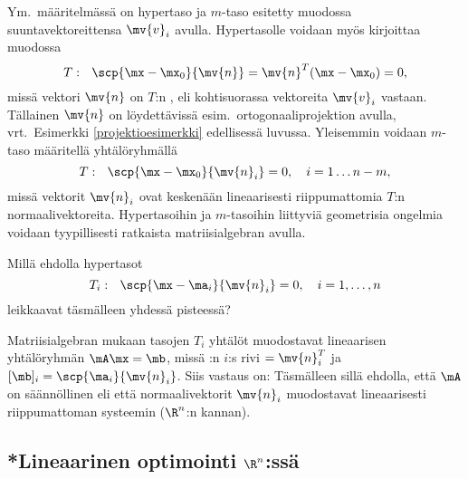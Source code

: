 Ym.\ määritelmässä on hypertaso ja $m$-taso esitetty
%
 muodossa suuntavektoreittensa $\mv{v}_i$ avulla. Hypertasolle voidaan myös
kirjoittaa  muodossa
\[ 
T:\ \ \scp{\mx-\mx_0}{\mv{n}} = \mv{n}^T(\mx-\mx_0) = 0, 
\]
missä vektori $\mv{n}$ on $T$:n
%
, eli kohtisuorassa vektoreita $\mv{v}_i$ vastaan.
Tällainen $\mv{n}$ on löydettävissä esim.\ ortogonaaliprojektion avulla, vrt.\ Esimerkki 
\ref{projektioesimerkki} edellisessä luvussa. Yleisemmin voidaan $m$-taso määritellä 
yhtälöryhmällä
\[ 
T:\ \ \scp{\mx-\mx_0}{\mv{n}_i} = 0, \quad i = 1 \ldots n-m, 
\]
missä vektorit $\mv{n}_i$ ovat keskenään lineaarisesti riippumattomia $T$:n normaalivektoreita.
Hypertasoihin ja $m$-tasoihin liittyviä geometrisia ongelmia voidaan tyypillisesti ratkaista 
matriisialgebran avulla.
\begin{Exa} Millä ehdolla hypertasot
\[ 
T_i:\ \ \scp{\mx-\ma_i}{\mv{n}_i} = 0, \quad i = 1, \ldots, n 
\]
leikkaavat täsmälleen yhdessä pisteessä? 
\end{Exa}
\ratk Matriisialgebran mukaan tasojen $T_i$ yhtälöt muodostavat lineaarisen yhtälöryhmän 
$\mA\mx = \mb$, missä \mA:n $i$:s rivi $= \mv{n}_i^T$ ja $[\mb]_i = \scp{\ma_i}{\mv{n}_i}$. 
Siis vastaus on: Täsmälleen sillä ehdolla, että $\mA$ on säännöllinen eli että normaalivektorit
$\mv{n}_i$ muodostavat lineaarisesti riippumattoman systeemin ($\R^n$:n kannan). \loppu  

\subsection{*Lineaarinen optimointi $\R^n$:ssä}
 

